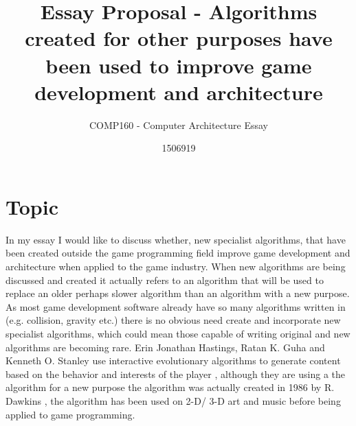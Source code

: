 \documentclass{scrartcl}
\title{Essay Proposal - Algorithms created for other purposes have been used to improve game development and architecture}
\subtitle{COMP160 - Computer Architecture Essay}
\author{1506919}
\begin{document}
\maketitle

\section*{Topic}

In my essay I would like to discuss whether, new specialist algorithms, that have been created outside the game programming field improve game development and architecture when applied to the game industry. When new algorithms are being discussed and created it actually refers to an algorithm that will be used to replace an older perhaps slower algorithm than an algorithm with a new purpose. As most game development software already have so many algorithms written in (e.g. collision, gravity etc.) there is no obvious need create and incorporate new specialist algorithms, which could mean those capable of writing original and new algorithms are becoming rare. Erin Jonathan Hastings, Ratan K. Guha and Kenneth O. Stanley use interactive evolutionary algorithms to generate content based on the behavior and interests of the player \cite{hastings2009automatic}, although they are using a the algorithm for a new purpose the algorithm was actually created in 1986 by R. Dawkins \cite{dawkins1986blind}, the algorithm has been used on 2-D/ 3-D art and music before being applied to game programming.
\end{document}
